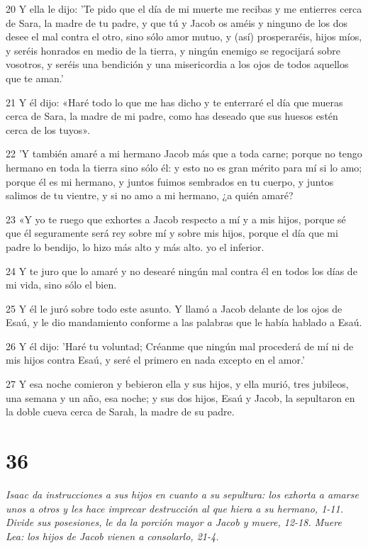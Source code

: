 \par 20 Y ella le dijo: 'Te pido que el día de mi muerte me recibas y me entierres cerca de Sara, la madre de tu padre, y que tú y Jacob os améis y ninguno de los dos desee el mal contra el otro, sino sólo amor mutuo, y (así) prosperaréis, hijos míos, y seréis honrados en medio de la tierra, y ningún enemigo se regocijará sobre vosotros, y seréis una bendición y una misericordia a los ojos de todos aquellos que te aman.'
\par 21 Y él dijo: «Haré todo lo que me has dicho y te enterraré el día que mueras cerca de Sara, la madre de mi padre, como has deseado que sus huesos estén cerca de los tuyos».
\par 22 'Y también amaré a mi hermano Jacob más que a toda carne; porque no tengo hermano en toda la tierra sino sólo él: y esto no es gran mérito para mí si lo amo; porque él es mi hermano, y juntos fuimos sembrados en tu cuerpo, y juntos salimos de tu vientre, y si no amo a mi hermano, ¿a quién amaré?
\par 23 «Y yo te ruego que exhortes a Jacob respecto a mí y a mis hijos, porque sé que él seguramente será rey sobre mí y sobre mis hijos, porque el día que mi padre lo bendijo, lo hizo más alto y más alto. yo el inferior.
\par 24 Y te juro que lo amaré y no desearé ningún mal contra él en todos los días de mi vida, sino sólo el bien.
\par 25 Y él le juró sobre todo este asunto. Y llamó a Jacob delante de los ojos de Esaú, y le dio mandamiento conforme a las palabras que le había hablado a Esaú.
\par 26 Y él dijo: 'Haré tu voluntad; Créanme que ningún mal procederá de mí ni de mis hijos contra Esaú, y seré el primero en nada excepto en el amor.'
\par 27 Y esa noche comieron y bebieron ella y sus hijos, y ella murió, tres jubileos, una semana y un año, esa noche; y sus dos hijos, Esaú y Jacob, la sepultaron en la doble cueva cerca de Sarah, la madre de su padre.

\chapter{36}

\par \textit{Isaac da instrucciones a sus hijos en cuanto a su sepultura: los exhorta a amarse unos a otros y les hace imprecar destrucción al que hiera a su hermano, 1-11. Divide sus posesiones, le da la porción mayor a Jacob y muere, 12-18. Muere Lea: los hijos de Jacob vienen a consolarlo, 21-4.}

